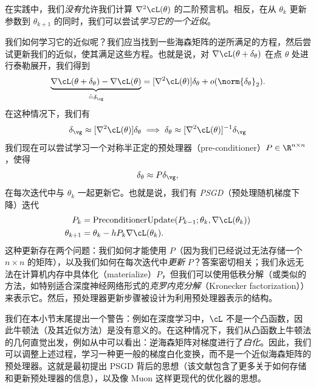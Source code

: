 \documentclass[../../book-main_zh.tex]{subfiles}
\begin{document}
在实践中，我们\textit{没有}允许我们计算 \(\nabla^{2}\cL(\theta)\) 的二阶预言机。相反，在从 \(\theta_{k}\) 更新参数到 \(\theta_{k + 1}\) 的同时，我们可以尝试\textit{学习它的一个近似}。

我们如何学习它的近似呢？我们应当找到一些海森矩阵的逆所满足的方程，然后尝试更新我们的近似，使其满足这些方程。也就是说，对 \(\nabla \cL(\theta + \delta_{\theta})\) 在点 \(\theta\) 处进行泰勒展开，我们得到
\begin{equation}
    \underbrace{\nabla \cL(\theta + \delta_{\theta}) - \nabla
    \cL(\theta)}_{\doteq \delta_{\vg}} = [\nabla^{2}
    \cL(\theta)]\delta_{\theta} + o(\norm{\delta_{\theta}}_{2}).
\end{equation}
在这种情况下，我们有
\begin{equation}
    \delta_{\vg} \approx [\nabla^{2}\cL(\theta)]\delta_{\theta}
    \implies \delta_{\theta} \approx [\nabla^{2}\cL(\theta)]^{-1}\delta_{\vg}
\end{equation}
我们现在可以尝试学习一个对称半正定的预处理器（pre-conditioner）\(P \in \R^{n \times n}\)，使得
\begin{equation}
    \delta_{\theta} \approx P\delta_{\vg},
\end{equation}
在每次迭代中与 \(\theta_{k}\) 一起更新它。也就是说，我们有 \textit{PSGD}（预处理随机梯度下降）迭代
\begin{align}
    P_{k}
    &= \mathrm{PreconditionerUpdate}(P_{k - 1}; \theta_{k}, \nabla
    \cL(\theta_{k})) \\
    \theta_{k + 1}
    &= \theta_{k} - hP_{k}\nabla \cL(\theta_{k}).
\end{align}
这种更新存在两个问题：我们如何才能使用 \(P\)（因为我们已经说过无法存储一个 \(n \times n\) 的矩阵），以及我们如何在每次迭代中\textit{更新} \(P\)？答案密切相关；我们永远无法在计算机内存中具体化（materialize）\(P\)，但我们可以使用低秩分解（或类似的方法，如特别适合深度神经网络形式的\textit{克罗内克分解}（Kronecker factorization））来表示它。然后，预处理器更新步骤被设计为利用预处理器表示的结构。

我们在本小节末尾提出一个警告：例如在深度学习中，\(\cL\) 不是一个凸函数，因此牛顿法（及其近似方法）是没有意义的。在这种情况下，我们从凸函数上牛顿法的几何直觉出发，例如从中可以看出：逆海森矩阵对梯度进行了\textit{白化}。因此，我们可以调整上述过程，学习一种更一般的梯度白化变换，而不是一个近似海森矩阵的预处理器。这就是最初提出 PSGD \cite{li2017preconditioned} 背后的思想（该文献包含了更多关于如何存储和更新预处理器的信息），以及像 Muon \cite{liu2025muon} 这样更现代的优化器的思想。
\end{document}
